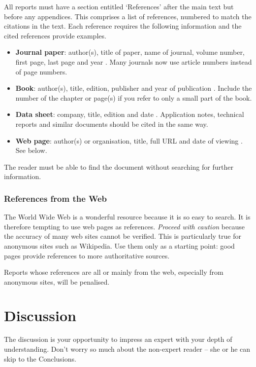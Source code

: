 \documentclass[a4paper,12pt]{article}
\begin{document}
All reports must have a section entitled `References' after the main text but before any appendices. This comprises a list of references, numbered to match the citations in the text. Each reference requires the following information and the cited references provide examples.
\begin{itemize}
\item
\textbf{Journal paper}: 
author(s), title of paper, name of journal, volume number, first page, last page and year \cite{gmf87}. 
Many journals now use article numbers instead of page numbers.
\item
\textbf{Book}: 
author(s), title, edition, publisher and year of publication \cite{jve05}.
Include the number of the chapter or page(s) if you refer to only a small part of the book.
\item
\textbf{Data sheet}: 
company, title, edition and date \cite{s08qg}. 
Application notes, technical reports and similar documents should be cited in the same way.
\item
\textbf{Web page}: 
author(s) or organisation, title, full URL and date of viewing \cite{mac09}. See below.
\end{itemize}
The reader must be able to find the document without searching for further information.

\subsubsection{References from the Web}

The World Wide Web is a wonderful resource because it is so easy to search. It is therefore tempting to use web pages as references. \emph{Proceed with caution} because the accuracy of many web sites cannot be verified. This is particularly true for anonymous sites such as Wikipedia. Use them only as a starting point: good pages provide references to more authoritative sources.

Reports whose references are all or mainly from the web, especially from anonymous sites, will be penalised.


\section{Discussion}

The discussion is your opportunity to impress an expert with your depth of understanding. Don't worry so much about the non-expert reader -- she or he can skip to the Conclusions.
\end{document}
